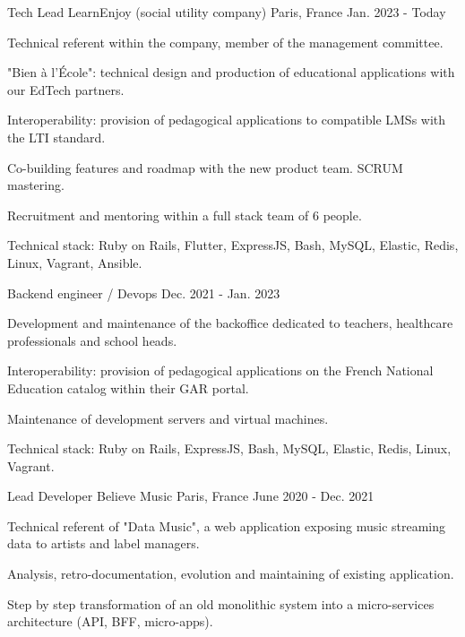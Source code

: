 \begin{cventries}
  \cventry
    {Tech Lead}
    {LearnEnjoy (social utility company)}
    {Paris, France}
    {Jan. 2023 - Today}
    {
      \begin{cvitems}
        \item {Technical referent within the company, member of the management committee.}
        \item {"Bien à l'École": technical design and production of educational applications with our EdTech partners.}
        \item {Interoperability: provision of pedagogical applications to compatible LMSs with the LTI standard.}
        \item {Co-building features and roadmap with the new product team. SCRUM mastering.}
        \item {Recruitment and mentoring within a full stack team of 6 people.}
        \item {Technical stack: Ruby on Rails, Flutter, ExpressJS, Bash, MySQL, Elastic, Redis, Linux, Vagrant, Ansible.}
      \end{cvitems}
      \vspace{-2.0mm}
    }
  \cventry
    {Backend engineer / Devops}
    {}
    {}
    {Dec. 2021 - Jan. 2023}
    {
      \begin{cvitems}
        \item {Development and maintenance of the backoffice dedicated to teachers, healthcare professionals and school heads.}
        \item {Interoperability: provision of pedagogical applications on the French National Education catalog within their GAR portal.}
        \item {Maintenance of development servers and virtual machines.}
        \item {Technical stack: Ruby on Rails, ExpressJS, Bash, MySQL, Elastic, Redis, Linux, Vagrant.}
      \end{cvitems}
    }
  \cventry
    {Lead Developer}
    {Believe Music}
    {Paris, France}
    {June 2020 - Dec. 2021}
    {
      \begin{cvitems}
        \item {Technical referent of "Data Music", a web application exposing music streaming data to artists and label managers.}
        \item {Analysis, retro-documentation, evolution and maintaining of existing application.}
        \item {Step by step transformation of an old monolithic system into a micro-services architecture (API, BFF, micro-apps).}

\end{cvitems}}
\end{cventries}
